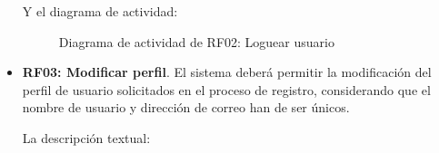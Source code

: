 \begin{itemize}
	Y el diagrama de actividad:
	
	\begin{figure}[!htb]
		\centering
		\caption{Diagrama de actividad de RF02: Loguear usuario}
		\label{fig:diagramaActividad_RF02}
	\end{figure}

	\FloatBarrier
	\item \textbf{RF03: Modificar perfil}. El sistema deberá permitir la modificación del perfil de usuario solicitados en el proceso de registro, considerando que el nombre de usuario y dirección de correo han de ser únicos.
	
	La descripción textual:
	

\end{itemize}
